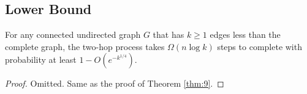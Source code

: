 \documentclass[
10pt, %
a4paper, %
oneside, %
headinclude,footinclude, %
BCOR5mm, %
]{scrartcl}
\begin{document}
\subsection{Lower Bound}
\begin{theorem}\label{thm:13}
	For any connected undirected graph $G$ that has $k \geq 1$ edges less than the complete graph, the two-hop process takes $\Omega(n\log k)$ steps to complete with probability at least $1 - O(e^{-k^{1/4}})$.
\end{theorem}
\begin{proof}
	Omitted. Same as the proof of Theorem \ref{thm:9}. 
\end{proof}


\renewcommand{\refname}{\spacedlowsmallcaps{References}} %




\end{document}
